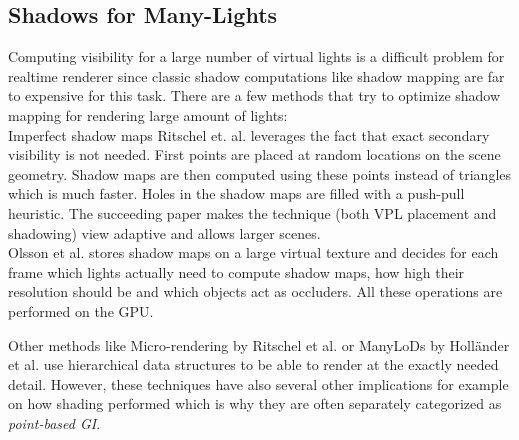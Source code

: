 \documentclass[thesis.tex]{subfiles}
\begin{document}
\subsection{Shadows for Many-Lights}
Computing visibility for a large number of virtual lights is a difficult problem for realtime renderer since classic shadow computations like shadow mapping are far to expensive for this task.
There are a few methods that try to optimize shadow mapping for rendering large amount of lights:
\\
Imperfect shadow maps Ritschel et. al. \cite{bib:imperfectshadowmaps} leverages the fact that exact secondary visibility is not needed.
First points are placed at random locations on the scene geometry.
Shadow maps are then computed using these points instead of triangles which is much faster.
Holes in the shadow maps are filled with a push-pull heuristic.
The succeeding paper \cite{bib:imperfectshadowmaps:adapative} makes the technique (both VPL placement and shadowing) view adaptive and allows larger scenes.
\\
Olsson et al. \cite{bib:virtualshadowmaps} stores shadow maps on a large virtual texture and decides for each frame which lights actually need to compute shadow maps, how high their resolution should be and which objects act as occluders.
All these operations are performed on the GPU.

Other methods like Micro-rendering by Ritschel et al. \cite{bib:microrendering} or ManyLoDs by Holländer et al. \cite{bib:manylods} use hierarchical data structures to be able to render at the exactly needed detail.
However, these techniques have also several other implications for example on how shading performed which is why they are often separately categorized as \emph{point-based GI}.

%
%
\end{document}
